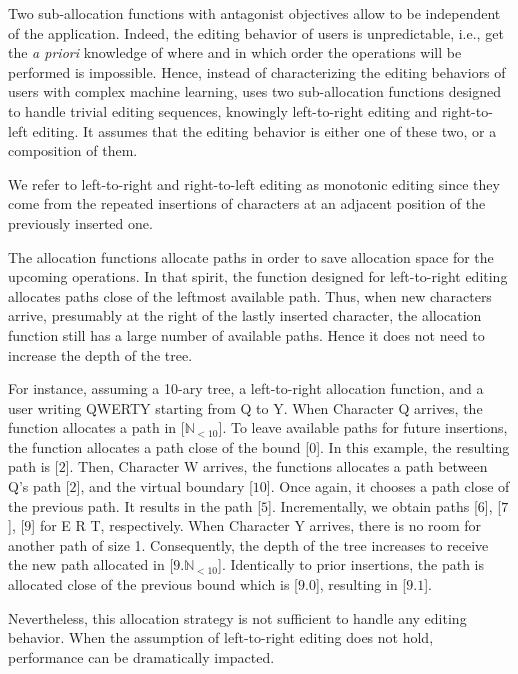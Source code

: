 \begin{asparadesc}
\item [Two sub-allocation functions] with antagonist objectives allow \LSEQ to
  be independent of the application. Indeed, the editing behavior of users is
  unpredictable, i.e., get the \emph{a priori} knowledge of where and in which
  order the operations will be performed is impossible. Hence, instead of
  characterizing the editing behaviors of users with complex machine learning,
  \LSEQ uses two sub-allocation functions designed to handle trivial editing
  sequences, knowingly left-to-right editing and right-to-left editing. It
  assumes that the editing behavior is either one of these two, or a composition
  of them.

  We refer to left-to-right and right-to-left editing as monotonic editing since
  they come from the repeated insertions of characters at an adjacent position of
  the previously inserted one.
  
  The allocation functions allocate paths in order to save allocation space for
  the upcoming operations. In that spirit, the function designed for
  left-to-right editing allocates paths close of the leftmost available path.
  Thus, when new characters arrive, presumably at the right of the lastly
  inserted character, the allocation function still has a large number of
  available paths. Hence it does not need to increase the depth of the tree.

  For instance, assuming a 10-ary tree, a left-to-right allocation function, and
  a user writing QWERTY starting from Q to Y. When Character Q arrives,
  the function allocates a path in [$\mathbb{N}_{<10}$]. To leave available
  paths for future insertions, the function allocates a path close of the bound
  [$0$]. In this example, the resulting path is [$2$]. Then, Character W
  arrives, the functions allocates a path between Q's path [$2$], and the
  virtual boundary [$10$]. Once again, it chooses a path close of the previous
  path. It results in the path [$5$]. Incrementally, we obtain paths [$6$],
  [$7$], [$9$] for E R T, respectively. When Character Y arrives, there is no
  room for another path of size 1. Consequently, the depth of the tree increases
  to receive the new path allocated in [$9.\mathbb{N}_{<10}$]. Identically to
  prior insertions, the path is allocated close of the previous bound which is
  [$9.0$], resulting in [$9.1$].

  Nevertheless, this allocation strategy is not sufficient to handle any editing
  behavior. When the assumption of left-to-right editing does not hold,
  performance can be dramatically impacted.


\end{asparadesc}
